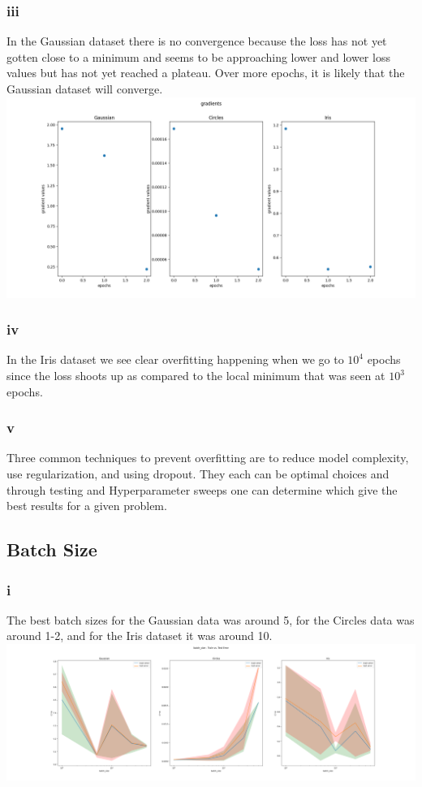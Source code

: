 \documentclass{article}
\begin{document}
\subsubsection{iii}
In the Gaussian dataset there is no convergence because the loss has not yet gotten close to a minimum and seems to be approaching lower and lower loss values but has not yet reached a plateau. Over more epochs, it is likely that the Gaussian dataset will converge.\\
\includegraphics*[width=16cm]{epoch_gradients}
\subsubsection{iv}
In the Iris dataset we see clear overfitting happening when we go to $10^4$ epochs since the loss shoots up as compared to the local minimum that was seen at $10^3$ epochs.
\subsubsection{v}
Three common techniques to prevent overfitting are to reduce model complexity, use regularization, and using dropout. They each can be optimal choices and through testing and Hyperparameter sweeps one can determine which give the best results for a given problem.
\subsection{Batch Size}
\subsubsection{i}
The best batch sizes for the Gaussian data was around 5, for the Circles data was around 1-2, and for the Iris dataset it was around 10.\\
\includegraphics*[width=16cm]{batch_size}
\end{document}
